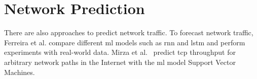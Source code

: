 \section{Network Prediction}

There are also approaches to predict network traffic.
To forecast network traffic, Ferreira et al. \cite{ferreiraForecastingNetworkTraffic2023} compare different \ac{ml} models such as \ac{rnn} and \ac{lstm} and perform experiments with real-world data.
Mirza et al.~\cite{mirzaMachineLearningApproach2007} predict \ac{tcp} throughput for arbitrary network paths in the Internet with the \ac{ml} model Support Vector Machines.


